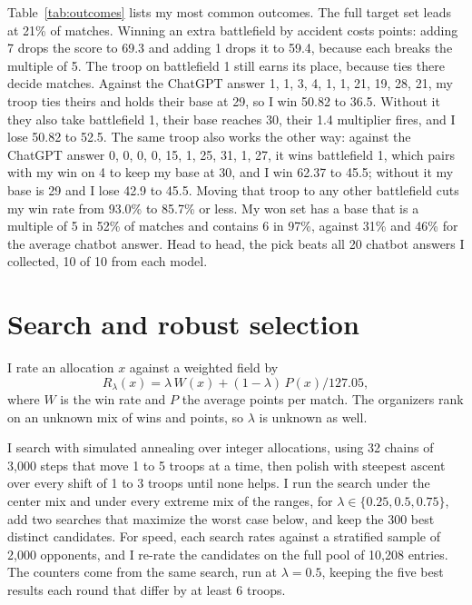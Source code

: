 \documentclass[10pt,a4paper,twocolumn]{article}
\begin{document}
Table~\ref{tab:outcomes} lists my most common outcomes.
The full target set leads at 21\% of matches.
Winning an extra battlefield by accident costs points: adding 7 drops the score to 69.3 and adding 1 drops it to 59.4, because each breaks the multiple of 5.
The troop on battlefield 1 still earns its place, because ties there decide matches.
Against the ChatGPT answer 1, 1, 3, 4, 1, 1, 21, 19, 28, 21, my troop ties theirs and holds their base at 29, so I win 50.82 to 36.5.
Without it they also take battlefield 1, their base reaches 30, their 1.4 multiplier fires, and I lose 50.82 to 52.5.
The same troop also works the other way: against the ChatGPT answer 0, 0, 0, 0, 15, 1, 25, 31, 1, 27, it wins battlefield 1, which pairs with my win on 4 to keep my base at 30, and I win 62.37 to 45.5; without it my base is 29 and I lose 42.9 to 45.5.
Moving that troop to any other battlefield cuts my win rate from 93.0\% to 85.7\% or less.
My won set has a base that is a multiple of 5 in 52\% of matches and contains 6 in 97\%, against 31\% and 46\% for the average chatbot answer.
Head to head, the pick beats all 20 chatbot answers I collected, 10 of 10 from each model.

\section{Search and robust selection}

I rate an allocation $x$ against a weighted field by
\begin{equation*}
  R_\lambda(x) = \lambda\, W(x) + (1-\lambda)\, P(x) / 127.05,
\end{equation*}
where $W$ is the win rate and $P$ the average points per match.
The organizers rank on an unknown mix of wins and points, so $\lambda$ is unknown as well.

I search with simulated annealing over integer allocations, using 32 chains of 3,000 steps that move 1 to 5 troops at a time, then polish with steepest ascent over every shift of 1 to 3 troops until none helps.
I run the search under the center mix and under every extreme mix of the ranges, for $\lambda \in \{0.25, 0.5, 0.75\}$, add two searches that maximize the worst case below, and keep the 300 best distinct candidates.
For speed, each search rates against a stratified sample of 2,000 opponents, and I re-rate the candidates on the full pool of 10,208 entries.
The counters come from the same search, run at $\lambda = 0.5$, keeping the five best results each round that differ by at least 6 troops.
\end{document}
